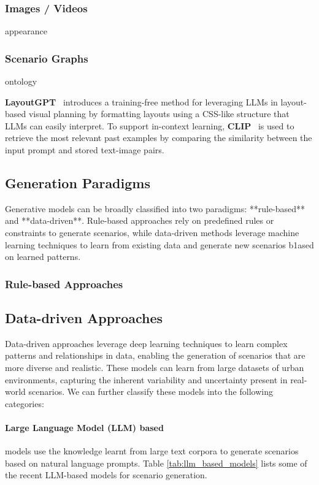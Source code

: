 \documentclass{article}
\begin{document}
\subsubsection{Images / Videos}
appearance

\subsubsection{Scenario Graphs}
ontology


\textbf{LayoutGPT}~\cite{feng2023layoutgpt} introduces a training-free method for leveraging LLMs in layout-based visual planning by formatting layouts using a CSS-like structure that LLMs can easily interpret. To support in-context learning, \textbf{CLIP}~\cite{radford2021learning} is used to retrieve the most relevant past examples by comparing the similarity between the input prompt and stored text-image pairs.

\subsection{Generation Paradigms}

Generative models can be broadly classified into two paradigms: **rule-based** and **data-driven**. Rule-based approaches rely on predefined rules or constraints to generate scenarios, while data-driven methods leverage machine learning techniques to learn from existing data and generate new scenarios b1ased on learned patterns.

\subsubsection{Rule-based Approaches}

\subsection{Data-driven Approaches}

Data-driven  approaches leverage deep learning techniques to learn complex patterns and relationships in data, enabling the generation of scenarios that are more diverse and realistic. These models can learn from large datasets of urban environments, capturing the inherent variability and uncertainty present in real-world scenarios. We can further classify these models into the following categories:

\paragraph{Large Language Model (LLM) based} models use the knowledge learnt from large text corpora to generate scenarios based on natural language prompts. Table \ref{tab:llm_based_models} lists some of the recent LLM-based models for scenario generation.
\end{document}
